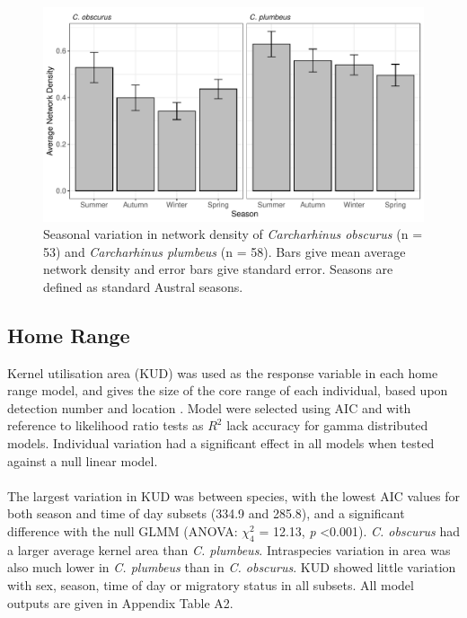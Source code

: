 \documentclass[11pt,a4paper]{article}
\begin{document}
	\begin{figure}[h]
		\centering\includegraphics[width=\textwidth]{../Results/network_season.pdf}
		\caption{Seasonal variation in network density of \textit{Carcharhinus obscurus} (n = 53) and \textit{Carcharhinus plumbeus} (n = 58). Bars give mean average network density and error bars give standard error. Seasons are defined as standard Austral seasons.}
		\label{net_seasons}
	\end{figure}
	
			
	\subsection{Home Range}
	
	Kernel utilisation area (KUD) was used as the response variable in each home range model, and gives the size of the core range of each individual, based upon detection number and location \citep{Jacoby2016}. Model were selected using AIC and with reference to likelihood ratio tests as $R^2$ lack accuracy for gamma distributed models. Individual variation had a significant effect in all models when tested against a null linear model.\\  
	\\
	The largest variation in KUD was between species, with the lowest AIC values for both season and time of day subsets (334.9 and 285.8), and a significant difference with the null GLMM (ANOVA: $\chi^2_4$ = 12.13, \textit{p} \textless 0.001). \textit{C. obscurus} had a larger average kernel area than \textit{C. plumbeus}. Intraspecies variation in area was also much lower in \textit{C. plumbeus} than in \textit{C. obscurus}. KUD showed little variation with sex, season, time of day or migratory status in all subsets. All model outputs are given in Appendix Table A2. 
	
\end{document}
